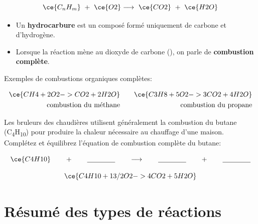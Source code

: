 \documentclass[
  11pt,
  a4paper,
  openany]{book}
\providecommand{\tightlist}{%
  \setlength{\itemsep}{0pt}\setlength{\parskip}{0pt}}
\begin{document}
\[ \ce{C_{n}H_{m}}\ +\ \ce{O2} \longrightarrow\ \ce{CO2}\ +\ \ce{H2O} \]

\begin{itemize}
\tightlist
\item
  Un \textbf{hydrocarbure} est un composé formé uniquement de carbone et d'hydrogène.
\item
  Lorsque la réaction mène au dioxyde de carbone (), on parle de \textbf{combustion complète}.
\end{itemize}

Exemples de combustions organiques complètes:

\[ \begin{split}
  \ce{CH4 + 2O2 -> CO2 + 2H2O} \\
  \text{combustion du méthane}
  \end{split}
  \qquad
  \begin{split}
  \ce{C3H8 + 5O2 -> 3CO2 + 4H2O} \\
    \text{combustion du propane}
  \end{split} \]

\begin{Exercise}
Les bruleurs des chaudières utilisent généralement la combustion du butane (C\textsubscript{4}H\textsubscript{10}) pour produire la chaleur nécessaire au chauffage d'une maison. Complétez et équilibrez l'équation de combustion complète du butane:

\[ \ce{C4H10} \qquad + \qquad \underline{\qquad\qquad} \qquad \longrightarrow \qquad \underline{\qquad\qquad} \qquad + \qquad \underline{\qquad\qquad} \]

\end{Exercise}

\begin{Answer}
\[ \ce{C4H10 + 13/2O2 -> 4CO2 + 5H2O} \]

\end{Answer}

\section{Résumé des types de réactions}\label{ruxe9sumuxe9-des-types-de-ruxe9actions}
\end{document}
